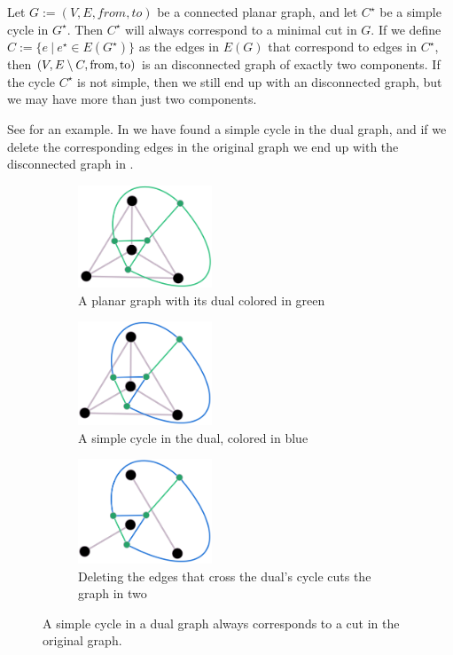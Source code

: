 \begin{fact}
\label{fact:dual-cycle-is-real-cut}
    Let $G := (V, E, from, to)$ be a connected planar graph, and let $C^\star$ be a simple cycle in $G^\star$. Then $C^\star$ will always correspond to a minimal cut in $G$. If we define $C := \{e ~ | ~ e^\star \in E(G^\star)\}$ as the edges in $E(G)$ that correspond to edges in $C^\star$, then $(V,E \setminus C, \operatorname{from}, \operatorname{to})$ is an disconnected graph of exactly two components. If the cycle $C^\star$ is not simple, then we still end up with an disconnected graph, but we may have more than just two components.

    See  for an example. In  we have found a simple cycle in the dual graph, and if we delete the corresponding edges in the original graph we end up with the disconnected graph in .
\end{fact}

\begin{figure}[h]
    \centering
    \begin{subfigure}{.3\textwidth}
        \centering
        \includegraphics[width=4cm]{figures/duality/k4 with dual.png}
        \caption{A planar graph with its dual colored in green}
        \label{subfigure:k4-with-dual}
    \end{subfigure}\hfill%
    \begin{subfigure}{.3\textwidth}
        \centering
        \includegraphics[width=4cm]{figures/duality/dual with cycle.png}
        \caption{A simple cycle in the dual, colored in blue}
        \label{figure:dual-with-cycle}
    \end{subfigure}\hfill%
    \begin{subfigure}{.3\textwidth}
        \centering
        \includegraphics[width=4cm]{figures/duality/k4 cut in pieces.png}
        \caption{Deleting the edges that cross the dual's cycle cuts the graph in two}
        \label{subfigure:k4-cut}
    \end{subfigure}
    \caption{A simple cycle in a dual graph always corresponds to a cut in the original graph.}
    \label{figure:cycle-cut}
\end{figure}

